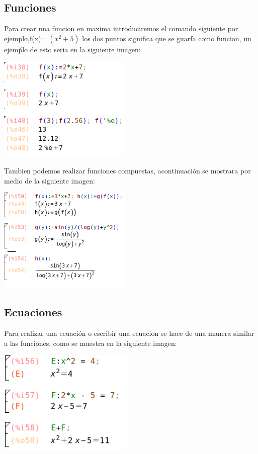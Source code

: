 \documentclass{article}
\begin{document}
\subsection{Funciones}
Para crear una funcion en maxima introduciremos el comando siguiente por ejemplo,f(x):=$(x^2+5)$ los dos puntos significa que se guarfa como funcion, un ejemṕlo de esto seria en la siguiente imagen:


\begin{center}
\includegraphics[height=5cm]{fto14.png}
\end{center}


Tambien podemos realizar funciones compuestas, acontinuación se mostrara por medio de la siguiente imagen:


\begin{center}
\includegraphics[height=5cm]{fto15.png}
\end{center}

\subsection{Ecuaciones}

Para realizar una ecuación o escribir una ecuacion se hace de una manera similar a las funciones, como se muestra en la siguiente imagen:

\begin{center}
\includegraphics[height=5cm]{fto16.png}
\end{center}
\end{document}
